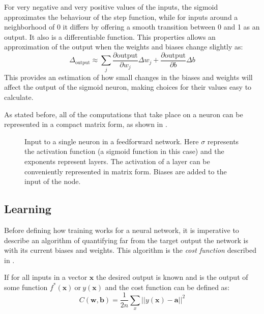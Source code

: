 For very negative and very positive values of the inputs, the sigmoid approximates
the behaviour of the step function, while for inputs around a neighborhood of 0
it differs by offering a smooth transition between 0 and 1 as an output. It also
is a differentiable function.
This properties allows an approximation of the output when the weights and
biases change slightly as:
\begin{equation*}
  \Delta_{\text{output}} \approx \sum_j\frac{\partial{\text{output}}}{\partial w_j} \Delta w_j + \frac{\partial{\text{output}}}{\partial b}\Delta b
\end{equation*}
This provides an estimation of how small changes in the biases and weights
will affect the output of the sigmoid neuron, making choices for their values
easy to calculate. 

As stated before, all of the computations that take place on a neuron
can be represented in a compact matrix form, as shown in .
\begin{figure}[!h]
  \centering
  \scalebox{1}{}
  \caption{Input to a single neuron in a feedforward network. Here
    $\sigma$ represents the activation function (a sigmoid function in
    this case) and the exponents represent layers. The activation of a
    layer can be conveniently represented in matrix form. Biases are added
    to the input of the node.}
  \label{fig:nn_activation}
\end{figure}

\newpage
\subsection*{Learning}

Before defining how training works for a neural network, it is
imperative to describe an algorithm of quantifying far from the
target output the network is with its current biases and weights.
This algorithm is the \textit{cost function} described in .

If for all inputs in a vector $\bm{x}$ the desired output is known and is
the output of some function $f^{*}(\bm{x}) ~\text{or}~ y(\bm{x})$ and the
cost function can be defined as:
\begin{equation}
  \label{eq:cost_func_simple}
  C(\bm{w}, \bm{b}) = \frac{1}{2n} \sum_x ||y(\bm{x}) - \bm{a}||^2
\end{equation}

